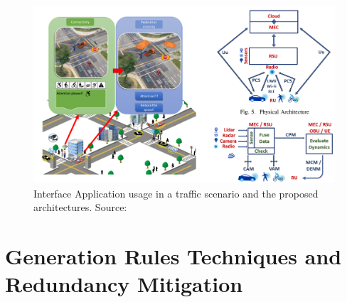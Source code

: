 \begin{figure}[ht!]
    \centering
    \includegraphics[width=13cm]{FIGURES/Fig13.png}
    \caption{Interface Application usage in a traffic scenario and the proposed architectures. Source: \cite{Militaru2021}}
    \label{fig:Mil}
\end{figure}


\section{Generation Rules Techniques and Redundancy Mitigation}

